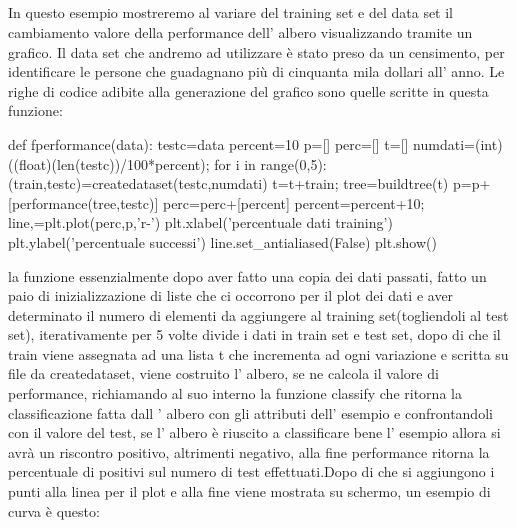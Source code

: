 		\subsection{}
		In questo esempio mostreremo al variare del training set e del data set il cambiamento valore della performance dell' albero visualizzando tramite un grafico.
		Il data set che andremo ad utilizzare è stato preso da un censimento, per identificare le persone che guadagnano più di cinquanta mila dollari all' anno.
		Le righe di codice adibite alla generazione del grafico sono quelle scritte in questa funzione:
		\begin{python}
		def fperformance(data):
			testc=data
			percent=10
			p=[]
			perc=[]
			t=[]
			numdati=(int)((float)(len(testc))/100*percent);
			for i in range(0,5):
				(train,testc)=createdataset(testc,numdati)
				t=t+train;
				tree=buildtree(t)
				p=p+[performance(tree,testc)]
				perc=perc+[percent]
				percent=percent+10;
				line,=plt.plot(perc,p,'r-')
			plt.xlabel('percentuale dati training')
			plt.ylabel('percentuale successi')
			line.set_antialiased(False)
			plt.show()
		\end{python}
		la funzione essenzialmente dopo aver fatto una copia dei dati passati, fatto un paio di inizializzazione di liste che ci occorrono per il plot dei dati e aver determinato il numero di elementi da aggiungere al training set(togliendoli al test set), iterativamente per 5 volte divide i dati in train set e test set, dopo di che il train viene assegnata ad una lista t che incrementa ad ogni variazione e scritta su file da createdataset, viene costruito l' albero, se ne calcola il valore di performance, richiamando al suo interno la funzione classify che ritorna la classificazione  fatta dall ' albero con gli attributi dell' esempio e confrontandoli con il valore del test, se l' albero è riuscito a classificare bene l' esempio allora si avrà un riscontro positivo, altrimenti negativo, alla fine performance ritorna la percentuale di positivi sul numero di test effettuati.Dopo di che si aggiungono i punti alla linea per il plot e alla fine viene mostrata su schermo, un esempio di curva è questo:
